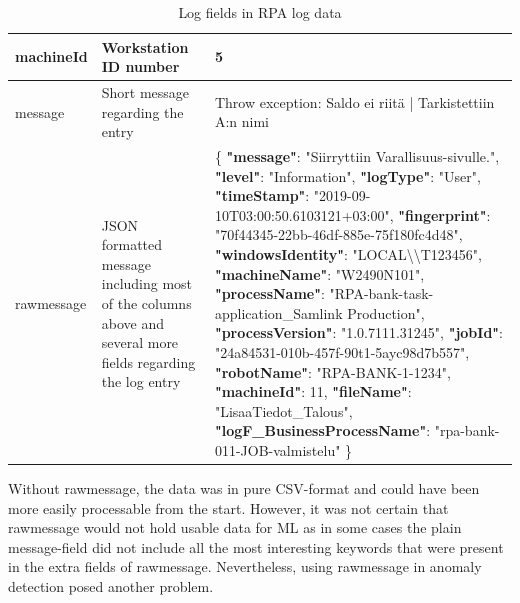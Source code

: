 \begin{table}[]
\begin{tabular}{|L{0.25\textwidth}|L{0.25\textwidth}|L{0.5\textwidth}|}
        machineId          & Workstation ID number                           & 5                                                                            \\ \hline
        message            & Short message regarding the entry               & Throw exception: Saldo ei riitä | \newline Tarkistettiin A:n nimi                    \\ \hline
        rawmessage         & JSON formatted message including most of the columns above and several more fields regarding the log entry &
        \{
        \textbf{"message"}: "Siirryttiin Varallisuus-sivulle.",\newline
        \textbf{"level"}: "Information",\newline
        \textbf{"logType"}: "User",\newline
        \textbf{"timeStamp"}: "2019-09-10T03:00:50.6103121+03:00",\newline
        \textbf{"fingerprint"}: "70f44345-22bb-46df-885e-75f180fc4d48",\newline
        \textbf{"windowsIdentity"}: "LOCAL\textbackslash{}\textbackslash{}T123456",\newline
        \textbf{"machineName"}: "W2490N101",\newline
        \textbf{"processName"}: "RPA-bank-task-application\_Samlink Production",\newline
        \textbf{"processVersion"}: "1.0.7111.31245",\newline
        \textbf{"jobId"}: "24a84531-010b-457f-90t1-5ayc98d7b557",\newline
        \textbf{"robotName"}: "RPA-BANK-1-1234",\newline
        \textbf{"machineId"}: 11,\newline
        \textbf{"fileName"}: "LisaaTiedot\_Talous",\newline
        \textbf{"logF\_BusinessProcessName"}: "rpa-bank-011-JOB-valmistelu"  \}
        \\ \hline
    \end{tabular}
    \caption{Log fields in RPA log data}
    \label{tab:log-row-fields}
\end{table}

Without rawmessage,
the data was in pure CSV-format
and could have been more easily processable from the start.
However,
it was not certain
that rawmessage would not hold usable data for ML
as in some cases the plain message-field did not include
all the most interesting keywords that were present
in the extra fields of rawmessage.
Nevertheless,
using rawmessage in anomaly detection
posed another problem.

